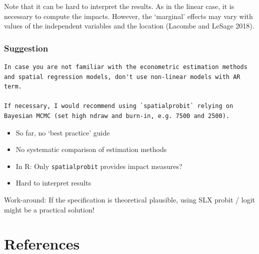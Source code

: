 \documentclass[
  letterpaper,
  DIV=11,
  numbers=noendperiod]{scrreprt}
\begin{document}
Note that it can be hard to interpret the results. As in the linear
case, it is necessary to compute the impacts. However, the `marginal'
effects may vary with values of the independent variables and the
location (Lacombe and LeSage 2018).

\hypertarget{suggestion}{%
\subsection{Suggestion}\label{suggestion}}

\begin{verbatim}
In case you are not familiar with the econometric estimation methods and spatial regression models, don't use non-linear models with AR term. 

If necessary, I would recommend using `spatialprobit` relying on Bayesian MCMC (set high ndraw and burn-in, e.g. 7500 and 2500).
\end{verbatim}

\begin{itemize}
\item
  So far, no `best practice' guide
\item
  No systematic comparison of estimation methods
\item
  In R: Only \texttt{spatialprobit} provides impact measures?
\item
  Hard to interpret results
\end{itemize}

Work-around: If the specification is theoretical plausible, using SLX
probit / logit might be a practical solution!


\hypertarget{references}{%
\chapter*{References}\label{references}}

\end{document}
